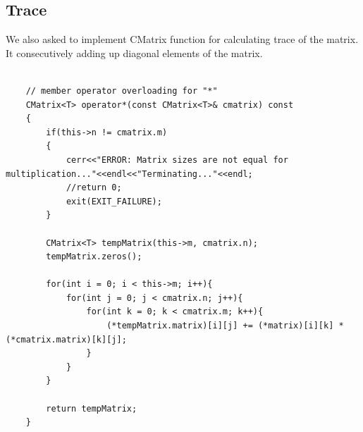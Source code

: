 \documentclass{article}
\begin{document}
	\subsection{Trace}
	We also asked to implement CMatrix function for calculating trace of the matrix. It consecutively adding up diagonal elements of the matrix.
	\begin{lstlisting}[label=CMatrixTrace, caption=CMatrix Trace]
	
    // member operator overloading for "*"
    CMatrix<T> operator*(const CMatrix<T>& cmatrix) const
    {
        if(this->n != cmatrix.m)
        {
            cerr<<"ERROR: Matrix sizes are not equal for multiplication..."<<endl<<"Terminating..."<<endl;
            //return 0;
            exit(EXIT_FAILURE);
        }

        CMatrix<T> tempMatrix(this->m, cmatrix.n);
        tempMatrix.zeros();

        for(int i = 0; i < this->m; i++){
            for(int j = 0; j < cmatrix.n; j++){
                for(int k = 0; k < cmatrix.m; k++){
                    (*tempMatrix.matrix)[i][j] += (*matrix)[i][k] * (*cmatrix.matrix)[k][j];
                }
            }
        }

        return tempMatrix;
    }
	\end{lstlisting}
	
\end{document}
